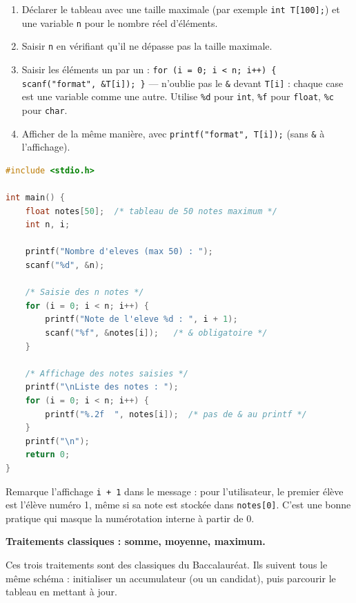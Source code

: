 \documentclass[11pt]{article}
\begin{document}
\begin{methode}
\begin{enumerate}
\item Déclarer le tableau avec une taille maximale (par exemple \texttt{int T[100];}) et une variable \texttt{n} pour le nombre réel d'éléments.
\item Saisir \texttt{n} en vérifiant qu'il ne dépasse pas la taille maximale.
\item Saisir les éléments un par un : \texttt{for (i = 0; i < n; i++) \{ scanf("format", \&T[i]); \}} — n'oublie pas le \texttt{\&} devant \texttt{T[i]} : chaque case est une variable comme une autre. Utilise \texttt{\%d} pour \texttt{int}, \texttt{\%f} pour \texttt{float}, \texttt{\%c} pour \texttt{char}.
\item Afficher de la même manière, avec \texttt{printf("format", T[i]);} (sans \texttt{\&} à l'affichage).
\end{enumerate}
\end{methode}

\begin{exemplebox}
\begin{lstlisting}[language=C]
#include <stdio.h>

int main() {
    float notes[50];  /* tableau de 50 notes maximum */
    int n, i;

    printf("Nombre d'eleves (max 50) : ");
    scanf("%d", &n);

    /* Saisie des n notes */
    for (i = 0; i < n; i++) {
        printf("Note de l'eleve %d : ", i + 1);
        scanf("%f", &notes[i]);   /* & obligatoire */
    }

    /* Affichage des notes saisies */
    printf("\nListe des notes : ");
    for (i = 0; i < n; i++) {
        printf("%.2f  ", notes[i]);  /* pas de & au printf */
    }
    printf("\n");
    return 0;
}
\end{lstlisting}
Remarque l'affichage \texttt{i + 1} dans le message : pour l'utilisateur, le premier élève est l'élève numéro 1, même si sa note est stockée dans \texttt{notes[0]}. C'est une bonne pratique qui masque la numérotation interne à partir de 0.
\end{exemplebox}

\textbf{Traitements classiques : somme, moyenne, maximum.}

Ces trois traitements sont des classiques du Baccalauréat. Ils suivent tous le même schéma : initialiser un accumulateur (ou un candidat), puis parcourir le tableau en mettant à jour.
\end{document}
